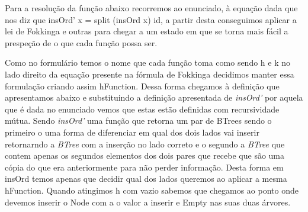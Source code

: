 \documentclass[a4paper]{article}
\begin{document}
Para a resolução da função abaixo recorremos ao enunciado, à equação dada que nos diz que insOrd' x = split (insOrd x) id, a partir desta conseguimos aplicar a lei de Fokkinga e outras para chegar a um estado em que se torna mais fácil a prespeção de o que cada função possa ser.

Como no formulário temos o nome que cada função toma como sendo h e k no lado direito da equação presente na fórmula de Fokkinga decidimos manter essa formulação criando assim hFunction.
Dessa forma chegamos à definição que apresentamos abaixo e substituindo a definição apresentada de \textit{insOrd'} por aquela que é dada no enunciado vemos que estas estão definidas com recursividade mútua.
Sendo \textit{insOrd'} uma função que retorna um par de BTrees sendo o primeiro o uma forma de diferenciar em qual dos dois lados vai inserir retornarndo a \textit{BTree} com a inserção no lado correto e o segundo a \textit{BTree} que contem apenas os segundos elementos dos dois pares que recebe que são uma cópia do que era anteriormente para não perder informação.
Desta forma em insOrd temos apenas que decidir qual dos lados queremos ao aplicar a mesma hFunction.
Quando atingimos h com vazio sabemos que chegamos ao ponto onde devemos inserir o Node com a o valor a inserir e Empty nas suas duas árvores.
\end{document}
